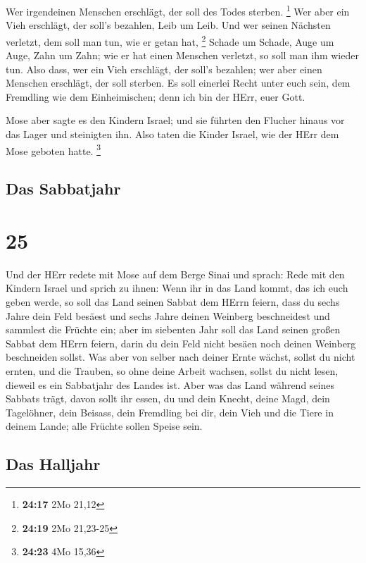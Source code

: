  Wer irgendeinen Menschen erschlägt, der soll des Todes
sterben. \footnote{\textbf{24:17} 2Mo 21,12}  Wer aber
ein Vieh erschlägt, der soll's bezahlen, Leib um Leib. 
Und wer seinen Nächsten verletzt, dem soll man tun, wie er getan hat,
\footnote{\textbf{24:19} 2Mo 21,23-25}  Schade um Schade,
Auge um Auge, Zahn um Zahn; wie er hat einen Menschen verletzt, so soll
man ihm wieder tun.  Also dass, wer ein Vieh erschlägt,
der soll's bezahlen; wer aber einen Menschen erschlägt, der soll
sterben.  Es soll einerlei Recht unter euch sein, dem
Fremdling wie dem Einheimischen; denn ich bin der HErr, euer Gott.

 Mose aber sagte es den Kindern Israel; und sie führten
den Flucher hinaus vor das Lager und steinigten ihn. Also taten die
Kinder Israel, wie der HErr dem Mose geboten hatte. \footnote{\textbf{24:23}
  4Mo 15,36}

\hypertarget{das-sabbatjahr}{%
\subsection{Das Sabbatjahr}\label{das-sabbatjahr}}

\hypertarget{section-24}{%
\section{25}\label{section-24}}

 Und der HErr redete mit Mose auf dem Berge Sinai und
sprach:  Rede mit den Kindern Israel und sprich zu ihnen:
Wenn ihr in das Land kommt, das ich euch geben werde, so soll das Land
seinen Sabbat dem HErrn feiern,  dass du sechs Jahre dein
Feld besäest und sechs Jahre deinen Weinberg beschneidest und sammlest
die Früchte ein;  aber im siebenten Jahr soll das Land
seinen großen Sabbat dem HErrn feiern, darin du dein Feld nicht besäen
noch deinen Weinberg beschneiden sollst.  Was aber von
selber nach deiner Ernte wächst, sollst du nicht ernten, und die
Trauben, so ohne deine Arbeit wachsen, sollst du nicht lesen, dieweil es
ein Sabbatjahr des Landes ist.  Aber was das Land während
seines Sabbats trägt, davon sollt ihr essen, du und dein Knecht, deine
Magd, dein Tagelöhner, dein Beisass, dein Fremdling bei dir,
 dein Vieh und die Tiere in deinem Lande; alle Früchte
sollen Speise sein.

\hypertarget{das-halljahr}{%
\subsection{Das Halljahr}\label{das-halljahr}}

